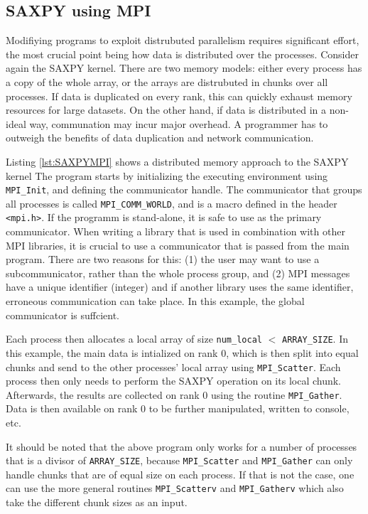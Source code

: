 \subsection{SAXPY using MPI}

Modifiying programs to exploit distrubuted parallelism requires significant effort, the most crucial point being how data is distributed over the processes. Consider again the SAXPY kernel. There are two memory models: either every process has a copy of the whole array, or the arrays are distrubuted in chunks over all processes. If data is duplicated on every rank, this can quickly exhaust memory resources for large datasets. On the other hand, if data is distributed in a non-ideal way, communation may incur major overhead. A programmer has to outweigh the benefits of data duplication and network communication. 

Listing \ref{lst:SAXPYMPI} shows a distributed memory approach to the SAXPY kernel
\noindent The program starts by initializing the executing environment using \texttt{MPI{\_}Init}, and defining the communicator handle. The communicator that groups all processes is called \texttt{MPI{\_}COMM{\_}WORLD}, and is a macro defined in the header \texttt{<mpi.h>}. If the programm is stand-alone, it is safe to use as the primary communicator. When writing a library that is used in combination with other MPI libraries, it is crucial to use a communicator that is passed from the main program. There are two reasons for this: (1) the user may want to use a subcommunicator, rather than the whole process group, and (2) MPI messages have a unique identifier (integer) and if another library uses the same identifier, erroneous communication can take place. In this example, the global communicator is suffcient.

Each process then allocates a local array of size \texttt{num{\_}local} $<$ \texttt{ARRAY{\_}SIZE}. In this example, the main data is intialized on rank 0, which is then split into equal chunks and send to the other processes' local array using \texttt{MPI{\_}Scatter}. Each process then only needs to perform the SAXPY operation on its local chunk. Afterwards, the results are collected on rank 0 using the routine \texttt{MPI{\_}Gather}. Data is then available on rank 0 to be further manipulated, written to console, etc. 

It should be noted that the above program only works for a number of processes that is a divisor of \texttt{ARRAY{\_}SIZE}, because \texttt{MPI{\_}Scatter} and \texttt{MPI{\_}Gather} can only handle chunks that are of equal size on each process. If that is not the case, one can use the more general routines \texttt{MPI{\_}Scatterv} and \texttt{MPI{\_}Gatherv} which also take the different chunk sizes as an input.

